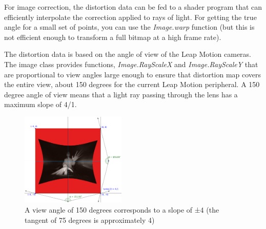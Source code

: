 \documentclass[journal]{IEEEtran}										    %
\begin{document}
                For image correction, the distortion data can be fed to a shader 
                program that can efficiently interpolate the correction applied to 
                rays of light. For getting the true angle for a small set of points, 
                you can use the \emph{Image.warp} function (but this is not efficient 
                enough to transform a full bitmap at a high frame rate).

                The distortion data is based on the angle of view of the Leap Motion 
                cameras. The image class provides functions, \emph{Image.RayScaleX} and 
                \emph{Image.RayScaleY} that are proportional to view angles large enough 
                to ensure that distortion map covers the entire view, about 150 degrees 
                for the current Leap Motion peripheral. A 150 degree angle of view means 
                that a light ray passing through the lens has a maximum slope of 4/1.

                \begin{figure}[h]
                    \centering
                    \includegraphics[width=5cm]{Leap-Image-Rays}
                    \caption{A view angle of 150 degrees corresponds to a slope of ±4 
                    (the tangent of 75 degrees is approximately 4)}
                    \label{fig:leapCam2}
                \end{figure}
\end{document}
